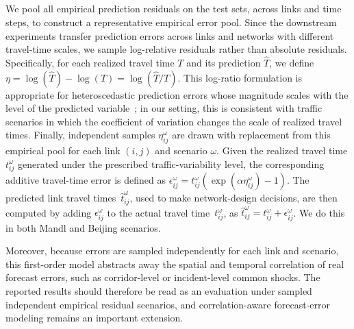\subsection{}\label{A3}

We pool all empirical prediction residuals on the test sets, across links and time steps, to construct a representative empirical error pool. Since the downstream experiments transfer prediction errors across links and networks with different travel-time scales, we sample log-relative residuals rather than absolute residuals. Specifically, for each realized travel time $T$ and its prediction $\hat T$, we define $\eta=\log(\hat T)-\log(T)=\log\left(\hat T/T\right)$.
%
This log-ratio formulation is appropriate for heteroscedastic prediction errors whose magnitude scales with the level of the predicted variable~\citep{Tofallis2015}; in our setting, this is consistent with traffic scenarios in which the coefficient of variation changes the scale of realized travel times. 
%
Finally, independent samples $\eta_{ij}^{\omega}$ are drawn with replacement from this empirical pool for each link $(i,j)$ and scenario $\omega$. Given the realized travel time $t_{ij}^{\omega}$ generated under the prescribed traffic-variability level, the corresponding additive travel-time error is defined as $\epsilon_{ij}^{\omega}=t_{ij}^{\omega}\left(\exp\!\left(\alpha\eta_{ij}^{\omega}\right)-1\right)$. The predicted link travel times~$\hat t_{ij}^{\omega}$, used to make network-design decisions, are then computed by adding $\epsilon_{ij}^{\omega}$ to the actual travel time~$t_{ij}^{\omega}$, as $\hat t_{ij}^{\omega}=t_{ij}^{\omega}+\epsilon_{ij}^{\omega}$. We do this in both Mandl and Beijing scenarios.

Moreover, because errors are sampled independently for each link and scenario, this first-order model abstracts away the spatial and temporal correlation of real forecast errors, such as corridor-level or incident-level common shocks. The reported results should therefore be read as an evaluation under sampled independent empirical residual scenarios, and correlation-aware forecast-error modeling remains an important extension. 

